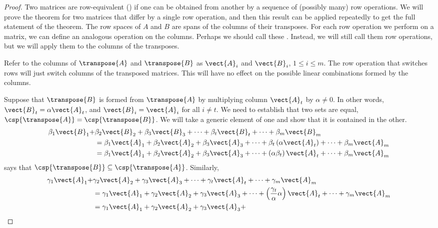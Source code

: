 %
\begin{proof}
Two matrices are row-equivalent () if one can be obtained from another by a sequence of (possibly many) row operations.  We will prove the theorem for two matrices that differ by a single row operation, and then this result can be applied repeatedly to get the full statement of the theorem.  The row spaces of $A$ and $B$ are spans of the columns of their transposes.  For each row operation we perform on a matrix, we can define an analogous operation on the columns.  Perhaps we should call these .  Instead, we will still call them row operations, but we will apply them to the columns of the transposes.\par
%
Refer to the columns of $\transpose{A}$ and $\transpose{B}$ as $\vect{A}_i$ and $\vect{B}_i$, $1\leq i\leq m$.  The row operation that switches rows will just switch columns of the transposed matrices.  This will have no effect on the possible linear combinations formed by the columns.\par
%
Suppose that $\transpose{B}$ is formed from $\transpose{A}$ by multiplying column $\vect{A}_t$ by $\alpha\neq 0$.  In other words, $\vect{B}_t=\alpha\vect{A}_t$, and $\vect{B}_i=\vect{A}_i$ for all $i\neq t$.  We need to establish that two sets are equal, $\csp{\transpose{A}}=\csp{\transpose{B}}$.  We will take a generic element of one and show that it is contained in the other.
%
\begin{align*}
\beta_1\vect{B}_1+
&
\beta_2\vect{B}_2+
\beta_3\vect{B}_3+
\cdots+
\beta_t\vect{B}_t+
\cdots+
\beta_m\vect{B}_m\\
%
&=
\beta_1\vect{A}_1+
\beta_2\vect{A}_2+
\beta_3\vect{A}_3+
\cdots+
\beta_t\left(\alpha\vect{A}_t\right)+
\cdots+
\beta_m\vect{A}_m\\
%
&=
\beta_1\vect{A}_1+
\beta_2\vect{A}_2+
\beta_3\vect{A}_3+
\cdots+
\left(\alpha\beta_t\right)\vect{A}_t+
\cdots+
\beta_m\vect{A}_m
\end{align*}
%
says that $\csp{\transpose{B}}\subseteq\csp{\transpose{A}}$.  Similarly,
%
\begin{align*}
\gamma_1\vect{A}_1+
&
\gamma_2\vect{A}_2+
\gamma_3\vect{A}_3+
\cdots+
\gamma_t\vect{A}_t+
\cdots+
\gamma_m\vect{A}_m\\
%
&=
\gamma_1\vect{A}_1+
\gamma_2\vect{A}_2+
\gamma_3\vect{A}_3+
\cdots+
\left(\frac{\gamma_t}{\alpha}\alpha\right)\vect{A}_t+
\cdots+
\gamma_m\vect{A}_m\\
%
&=
\gamma_1\vect{A}_1+
\gamma_2\vect{A}_2+
\gamma_3\vect{A}_3+

\end{align*}
\end{proof}
